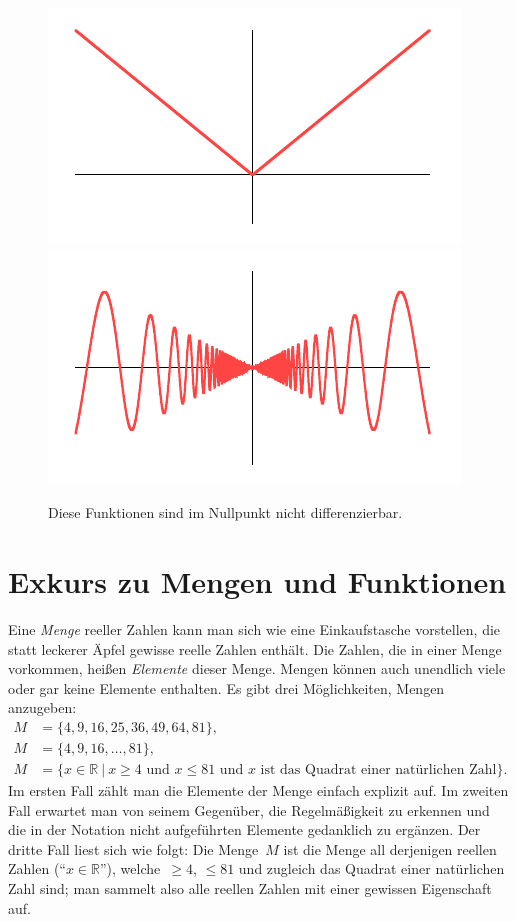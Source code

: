 \documentclass[twoside]{../zirkelblatt}
\newcommand{\RR}{\mathbb{R}}
\theoremstyle{definition}
\theoremstyle{plain}
\theoremstyle{remark}
\begin{document}
\begin{figure}[b]
  \centering
  \includegraphics{sdg-nicht-diffbar1}
  \includegraphics{sdg-nicht-diffbar2}
  \caption{\label{fig:nicht-diffbar}Diese Funktionen sind im Nullpunkt nicht
  differenzierbar.}
\end{figure}


\section{Exkurs zu Mengen und Funktionen}

Eine \emph{Menge} reeller Zahlen kann man sich wie eine Einkaufstasche
vorstellen, die statt leckerer Äpfel gewisse reelle Zahlen enthält. Die Zahlen,
die in einer Menge vorkommen, heißen \emph{Elemente} dieser Menge. Mengen
können auch unendlich viele oder gar keine Elemente enthalten. Es gibt drei
Möglichkeiten, Mengen anzugeben:
\begin{align*}
  M &= \{ 4, 9, 16, 25, 36, 49, 64, 81 \}, \\
  M &= \{ 4, 9, 16, \ldots, 81 \}, \\
  M &= \{ x \in \RR \ |\ \text{$x \geq 4$ und $x \leq 81$ und $x$ ist das Quadrat
  einer natürlichen Zahl} \}.
\end{align*}
Im ersten Fall zählt man die Elemente der Menge einfach explizit auf. Im
zweiten Fall erwartet man von seinem Gegenüber, die Regelmäßigkeit zu erkennen
und die in der Notation nicht aufgeführten Elemente gedanklich zu ergänzen. Der
dritte Fall liest sich wie folgt: Die Menge~$M$ ist die Menge all derjenigen
reellen Zahlen ("`$x \in \RR$"'), welche~$\geq 4$, $\leq 81$ und zugleich das
Quadrat einer natürlichen Zahl sind; man sammelt also alle reellen Zahlen mit
einer gewissen Eigenschaft auf.
\end{document}
